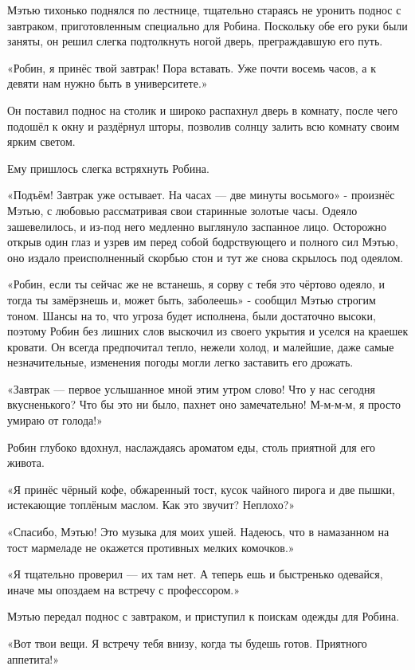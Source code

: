 \documentclass[a4paper,12pt]{book}
\begin{document}
Мэтью тихонько поднялся по лестнице, тщательно стараясь не уронить поднос с завтраком, приготовленным специально для Робина. Поскольку обе его руки были заняты, он решил слегка подтолкнуть ногой дверь, преграждавшую его путь.
\par
«Робин, я принёс твой завтрак! Пора вставать. Уже почти восемь часов, а к девяти нам нужно быть в университете.»
\par
Он поставил поднос на столик и широко распахнул дверь в комнату, после чего подошёл к окну и раздёрнул шторы, позволив солнцу залить всю комнату своим ярким светом.
\par
Ему пришлось слегка встряхнуть Робина.
\par
«Подъём! Завтрак уже остывает. На часах — две минуты восьмого» - произнёс Мэтью, с любовью рассматривая свои старинные золотые часы. Одеяло зашевелилось, и из-под него медленно выглянуло заспанное лицо. Осторожно открыв один глаз и узрев им перед собой бодрствующего и полного сил Мэтью, оно издало преисполненный скорбью стон и тут же снова скрылось под одеялом.
\par
«Робин, если ты сейчас же не встанешь, я сорву с тебя это чёртово одеяло, и тогда ты замёрзнешь и, может быть, заболеешь» - сообщил Мэтью строгим тоном. Шансы на то, что угроза будет исполнена, были достаточно высоки, поэтому Робин без лишних слов выскочил из своего укрытия и уселся на краешек кровати. Он всегда предпочитал тепло, нежели холод, и малейшие, даже самые незначительные, изменения погоды могли легко заставить его дрожать.
\par
«Завтрак — первое услышанное мной этим утром слово! Что у нас сегодня вкусненького? Что бы это ни было, пахнет оно замечательно! М-м-м-м, я просто умираю от голода!»
\par
Робин глубоко вдохнул, наслаждаясь ароматом еды, столь приятной для его живота.
\par
«Я принёс чёрный кофе, обжаренный тост, кусок чайного пирога и две пышки, истекающие топлёным маслом. Как это звучит? Неплохо?»
\par
«Спасибо, Мэтью! Это музыка для моих ушей. Надеюсь, что в намазанном на тост мармеладе не окажется противных мелких комочков.»
\par
«Я тщательно проверил — их там нет. А теперь ешь и быстренько одевайся, иначе мы опоздаем на встречу с профессором.»
\par
Мэтью передал поднос с завтраком, и приступил к поискам одежды для Робина.
\par
«Вот твои вещи. Я встречу тебя внизу, когда ты будешь готов. Приятного аппетита!»
\end{document}
